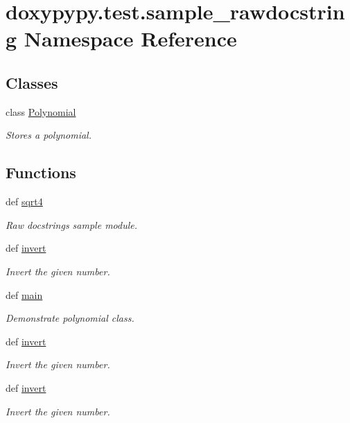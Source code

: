 \hypertarget{namespacedoxypypy_1_1test_1_1sample__rawdocstring}{\section{doxypypy.\-test.\-sample\-\_\-rawdocstring Namespace Reference}
\label{namespacedoxypypy_1_1test_1_1sample__rawdocstring}
}
\subsection*{Classes}
\begin{DoxyCompactItemize}
\item 
class \hyperlink{classdoxypypy_1_1test_1_1sample__rawdocstring_1_1_polynomial}{Polynomial}
\begin{DoxyCompactList}\small\item\em Stores a polynomial. \end{DoxyCompactList}\end{DoxyCompactItemize}
\subsection*{Functions}
\begin{DoxyCompactItemize}
\item 
def \hyperlink{namespacedoxypypy_1_1test_1_1sample__rawdocstring_a2153836fb8dbf5b98684d9860405a41d}{sqrt4}
\begin{DoxyCompactList}\small\item\em Raw docstrings sample module. \end{DoxyCompactList}\item 
def \hyperlink{namespacedoxypypy_1_1test_1_1sample__rawdocstring_ae6761115e16d5d1df74cbd1e1149c570}{invert}
\begin{DoxyCompactList}\small\item\em Invert the given number. \end{DoxyCompactList}\item 
def \hyperlink{namespacedoxypypy_1_1test_1_1sample__rawdocstring_a030ab10834f300c7bb604ad30293eadf}{main}
\begin{DoxyCompactList}\small\item\em Demonstrate polynomial class. \end{DoxyCompactList}\item 
def \hyperlink{namespacedoxypypy_1_1test_1_1sample__rawdocstring_ae6761115e16d5d1df74cbd1e1149c570}{invert}
\begin{DoxyCompactList}\small\item\em Invert the given number. \end{DoxyCompactList}\item 
def \hyperlink{namespacedoxypypy_1_1test_1_1sample__rawdocstring_a14a6d7c1b5d2474e6d9c20f33c1e5f76}{invert}
\begin{DoxyCompactList}\small\item\em Invert the given number. \end{DoxyCompactList}\end{DoxyCompactItemize}


